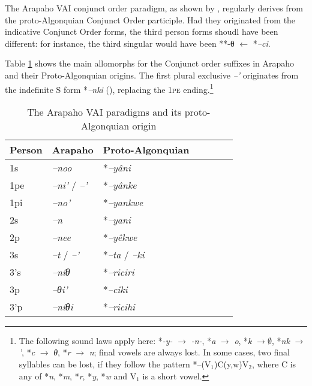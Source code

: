 \documentclass[twoside,a4paper,11pt]{article}
\newcommand{\ipa}[1]{{\phon\textit{#1}}}
\newcommand{\grise}[1]{\cellcolor{lightgray}\textbf{#1}}
\newcommand{\Σ}{\greek{Σ}}
\begin{document}
The Arapaho VAI conjunct order paradigm, as shown by \citet[16-7]{goddard65arapaho}, regularly derives from the proto-Algonquian Conjunct Order participle. Had they originated from the indicative Conjunct Order forms, the third person forms shoudl have been different: for instance, the third singular would have been **-θ $\leftarrow$ *\ipa{--ci}.

Table \ref{tab:arapaho.vai} shows the main  allomorphs for the Conjunct order suffixes in Arapaho and their Proto-Algonquian origins. The first plural exclusive \ipa{--'} originates from the indefinite S form *\ipa{--nki} (\citealt{goddard98morphology.arapaho}), replacing the \textsc{1pe} ending.\footnote{The following sound laws apply here: *\ipa{-y-} $\rightarrow$ \ipa{-n-}, *\ipa{a} $\rightarrow$ \ipa{o}, *\ipa{k} $\rightarrow \emptyset $, *\ipa{nk} $\rightarrow$ \ipa{'}, *\ipa{c} $\rightarrow$ \ipa{θ},  *\ipa{r} $\rightarrow$ \ipa{n}; final vowels are always lost. In some cases, two final syllables can be lost, if they follow the pattern *--(V${_1}$)C(y,w)V${_2}$, where C is any of *\ipa{n}, *\ipa{m}, *\ipa{r}, *\ipa{y}, *\ipa{w} and V${_1}$ is a short vowel. }



\begin{table}[H]
\caption{The Arapaho VAI paradigms and its proto-Algonquian origin}
\centering \label{tab:arapaho.vai}
\begin{tabular}{lllllll}
\toprule
Person &   Arapaho    & Proto-Algonquian\\
\midrule
1s & 	\ipa{--noo} &  	*\ipa{--yâni} & 	\\	
1pe & 	\ipa{--ni'} /  	\ipa{--'} \grise{} & 		 *\ipa{--yânke}	 \\	
1pi & 	\ipa{--no'} & 	 		*\ipa{--yankwe} & 	\\	
\midrule
2s & 	\ipa{--n} & 	 	*\ipa{--yani} & 	\\	
2p & 	\ipa{--nee} & 	  		*\ipa{--yêkwe} & 	\\	
\midrule
3s & 	\ipa{--t} /	\ipa{--'} & 		*\ipa{--ta} / \ipa{--ki}& 	\\	
3's & 	\ipa{--níθ} &  		*\ipa{--riciri} & 	\\	
3p & 	\ipa{--θi'} &  		*\ipa{--ciki} 	\\	
3'p & 	\ipa{--níθi} & 	 		*\ipa{--ricihi} 	\\	
\bottomrule
\end{tabular}
\end{table}
\end{document}
